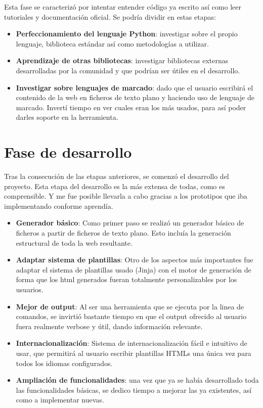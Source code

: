 Esta fase se caracterizó por intentar entender código ya escrito así como leer tutoriales y documentación
oficial. Se podría dividir en estas etapas:

\begin{itemize}
\item \textbf{Perfeccionamiento del lenguaje Python}: investigar sobre el propio lenguaje, biblioteca estándar
así como metodologías a utilizar.
\item \textbf{Aprendizaje de otras bibliotecas}: investigar bibliotecas externas desarrolladas por la comunidad y
que podrían ser útiles en el desarrollo.
\item \textbf{Investigar sobre lenguajes de marcado}: dado que el usuario escribirá el contenido de la web en ficheros
de texto plano y haciendo uso de lenguaje de marcado. Invertí tiempo en ver cuales eran los más usados, para así poder
darles soporte en la herramienta.
\end{itemize}

\section{Fase de desarrollo}

Tras la consecución de las etapas anteriores, se comenzó el desarrollo del proyecto. Esta etapa del desarrollo 
es la más extensa de todas, como es comprensible. Y me fue posible llevarla a cabo gracias a los
prototipos que iba implementando conforme aprendía.

\begin{itemize}
\item \textbf{Generador básico}: Como primer paso se realizó un generador básico de ficheros a partir 
de ficheros de texto plano. Esto incluía la generación estructural de toda la web resultante.
\item \textbf{Adaptar sistema de plantillas}: Otro de los aspectos más importantes fue adaptar el sistema 
de plantillas usado (Jinja) con el motor de generación de forma que los html generados fueran totalmente
personalizables por los usuarios.
\item \textbf{Mejor de output}: Al ser una herramienta que se ejecuta por la linea de comandos, se invirtió
bastante tiempo en que el output ofrecido al usuario fuera realmente verbose y útil, dando información relevante.
\item \textbf{Internacionalización}: Sistema de internacionalización fácil e intuitivo de usar, que permitirá al usuario
escribir plantillas HTMLs una única vez para todos los idiomas configurados.
\item \textbf{Ampliación de funcionalidades}: una vez que ya se había desarrollado toda las funcionalidades básicas,
se dedico tiempo a mejorar las ya existentes, así como a implementar nuevas.
\end{itemize}


